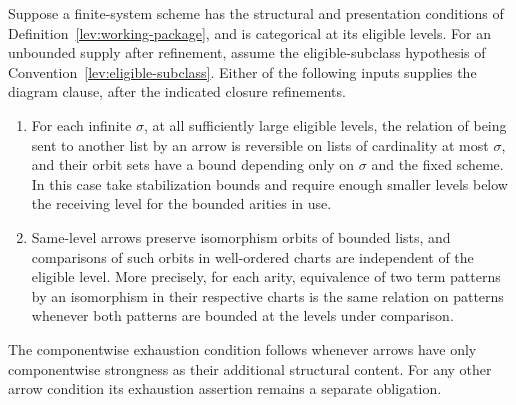 \begin{proposition}
\label{lev:scheme-diagram-routes}
Suppose a finite-system scheme has the structural and presentation
conditions of Definition~\ref{lev:working-package}, and is categorical
at its eligible levels.  For an unbounded supply after refinement,
assume the eligible-subclass hypothesis of
Convention~\ref{lev:eligible-subclass}.  Either of the following inputs
supplies the diagram clause, after the indicated closure refinements.
\begin{enumerate}
\item For each infinite $\sigma$, at all sufficiently large eligible
levels, the relation of being sent to another list by an arrow is
reversible on lists of cardinality at most $\sigma$, and their orbit
sets have a bound depending only on $\sigma$ and the fixed scheme.
In this case take stabilization bounds and require enough smaller
levels below the receiving level for the bounded arities in use.

\item Same-level arrows preserve isomorphism orbits of bounded lists,
and comparisons of such orbits in well-ordered charts are independent
of the eligible level.  More precisely, for each arity, equivalence
of two term patterns by an isomorphism in their respective charts is
the same relation on patterns whenever both patterns are bounded at
the levels under comparison.
\end{enumerate}
The componentwise exhaustion condition follows whenever arrows have
only componentwise strongness as their additional structural content.
For any other arrow condition its exhaustion assertion remains a
separate obligation.
\end{proposition}

